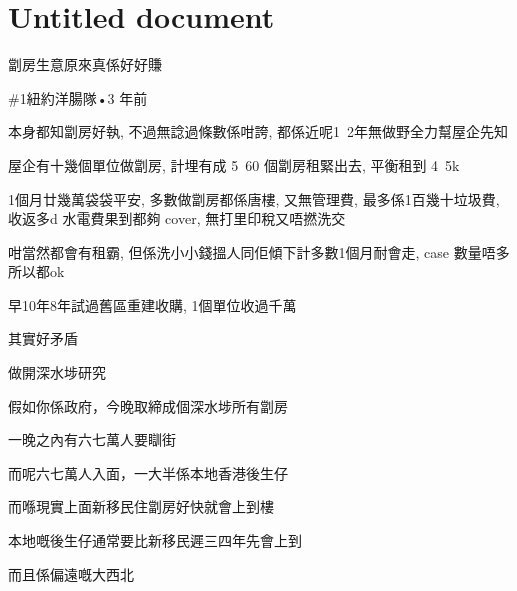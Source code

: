 \chapter{Untitled document}

劏房生意原來真係好好賺

\#1紐約洋腸隊•3 年前

本身都知劏房好執, 不過無諗過條數係咁誇, 都係近呢1~2年無做野全力幫屋企先知

屋企有十幾個單位做劏房, 計埋有成 5~60 個劏房租緊出去, 平衡租到 4~5k

1個月廿幾萬袋袋平安, 多數做劏房都係唐樓, 又無管理費, 最多係1百幾十垃圾費, 收返多d 水電費果到都夠 cover, 無打里印稅又唔撚洗交

咁當然都會有租霸, 但係洗小小錢搵人同佢傾下計多數1個月耐會走, case 數量唔多所以都ok

早10年8年試過舊區重建收購, 1個單位收過千萬

其實好矛盾

做開深水埗研究

假如你係政府，今晚取締成個深水埗所有劏房

一晚之內有六七萬人要瞓街

而呢六七萬人入面，一大半係本地香港後生仔

而喺現實上面新移民住劏房好快就會上到樓

本地嘅後生仔通常要比新移民遲三四年先會上到

而且係偏遠嘅大西北

